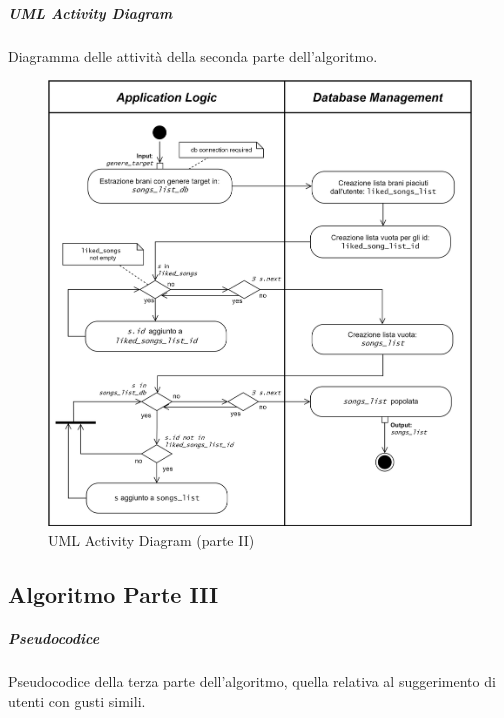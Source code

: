 \newpage
\subparagraph{UML Activity Diagram}
Diagramma delle attività della seconda parte dell'algoritmo.
\begin{figure} [H]
    \centering
    \includegraphics[scale=0.75]{images/flowchart_2_UML_ver2.png}
    \caption{UML Activity Diagram (parte II)}
    \label{fig-uml-ac-2}
\end{figure}




\newpage
\subsection{Algoritmo Parte III}

\subparagraph{Pseudocodice}
Pseudocodice della terza parte dell'algoritmo, quella relativa al
suggerimento di utenti con gusti simili. 



